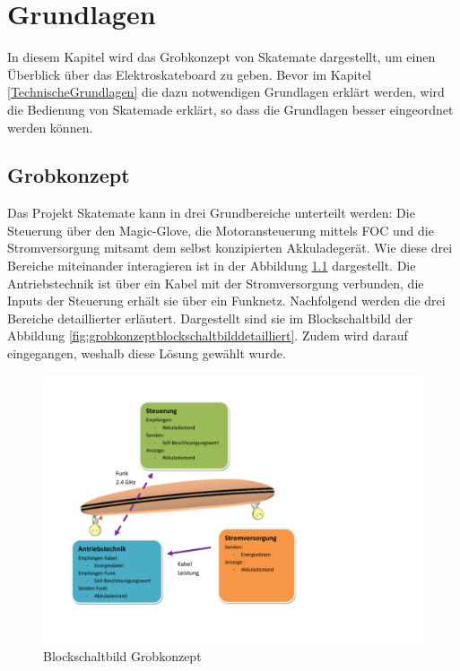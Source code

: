 \chapter{Grundlagen}
\label{Grundlagen}
In diesem Kapitel wird das Grobkonzept von Skatemate dargestellt, um einen Überblick über das Elektroskateboard zu geben. Bevor im Kapitel \ref{TechnischeGrundlagen} die dazu notwendigen Grundlagen erklärt werden, wird die Bedienung von Skatemade erklärt, so dass die Grundlagen besser eingeordnet werden können. 
\section{Grobkonzept}
\label{Grobkonzept}
Das Projekt Skatemate kann in drei Grundbereiche unterteilt werden: Die Steuerung über den Magic-Glove, die Motoransteuerung mittels FOC und die Stromversorgung mitsamt dem selbst konzipierten Akkuladegerät. Wie diese drei Bereiche miteinander interagieren ist in der Abbildung \ref{fig:grobkonzeptblockschaltbildgrob} dargestellt. Die Antriebstechnik ist über ein Kabel mit der Stromversorgung verbunden, die Inputs der Steuerung erhält sie über ein Funknetz. Nachfolgend werden die drei Bereiche detaillierter erläutert. Dargestellt sind sie im Blockschaltbild der Abbildung \ref{fig:grobkonzeptblockschaltbilddetailliert}. Zudem wird darauf eingegangen, weshalb diese Lösung gewählt wurde. 
\begin{figure}[H]
	\centering
	\includegraphics[width=0.7\linewidth, keepaspectratio]{images/Grobkonzept_Blockschaltbild_grob}
	\caption[Blockschaltbild Grobkonzept]{Blockschaltbild Grobkonzept}
	\label{fig:grobkonzeptblockschaltbildgrob}
\end{figure}

